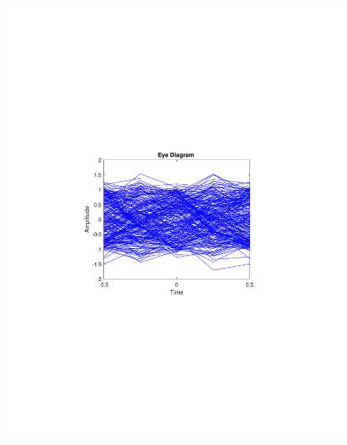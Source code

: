 \begin{refsection}
\begin{figure}[H]
\begin{minipage}{0.30\textwidth}
		\includegraphics[clip, trim=4cm 8cm 4cm 8cm, width=1\textwidth]{./sdf/m_qam_system/figures/expResults/intradyne/3_eye_4GBdInSig13dB_AfMIMO1.pdf}
		\label{fig:4GBdSpecMIMO1}
	\end{minipage}
	\begin{minipage}{0.30\textwidth}
		\centering

\end{minipage}
\end{figure}
\end{refsection}
